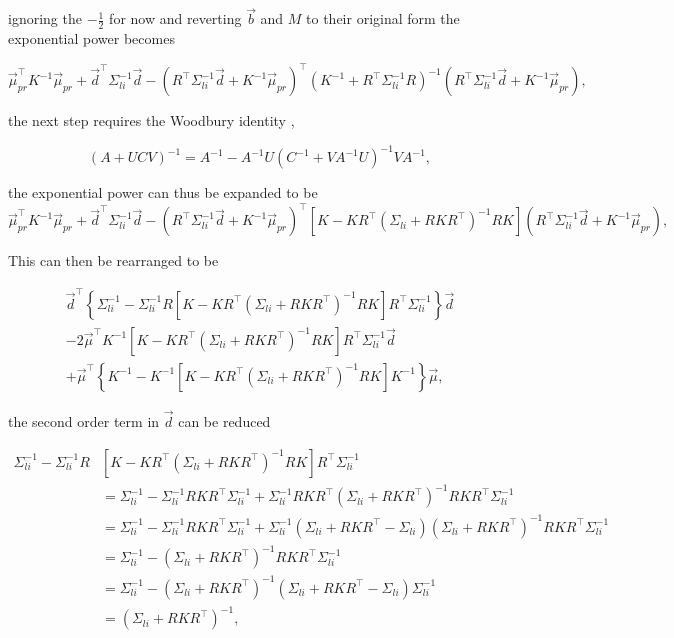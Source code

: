 \noindent ignoring the $-\frac{1}{2}$ for now and reverting $\vec b$ and $M$ to their original form the exponential power becomes

$$
\vec{\mu}_{pr}^{\top} K^{-1} \vec{\mu}_{pr} + \vec{d}^{\top} \Sigma_{li}^{-1} \vec{d}- (R^{\top} \Sigma_{li}^{-1} \vec{d} + K^{-1}\vec{\mu}_{pr})^{\top} (K^{-1} + R^{\top} \Sigma_{li}^{-1} R)^{-1} (R^{\top} \Sigma_{li}^{-1} \vec{d} + K^{-1}\vec{\mu}_{pr}),
$$

\noindent the next step requires the Woodbury identity \cite{gp4ml}, 

\begin{equation}
(A + UCV)^{-1} = A^{-1} - A^{-1}U(C^{-1}+VA^{-1}U)^{-1}VA^{-1},
\end{equation}

\noindent the exponential power can thus be expanded to be
$$
\vec{\mu}_{pr}^{\top} K^{-1} \vec{\mu}_{pr} + \vec{d}^{\top} \Sigma_{li}^{-1} \vec{d} - (R^{\top} \Sigma_{li}^{-1} \vec{d} + K^{-1}\vec{\mu}_{pr})^{\top} \left[K - K R^{\top} \left(\Sigma_{li} + RK R^{\top}\right)^{-1} R K \right] (R^{\top} \Sigma_{li}^{-1} \vec{d} + K^{-1}\vec{\mu}_{pr}),
$$

\noindent This can then be rearranged to be

\begin{multline*}
\vec{d}^{\top} \left\{ \Sigma_{li}^{-1} - \Sigma_{li}^{-1} R \left[K - K R^{\top} \left(\Sigma_{li} + RK R^{\top}\right)^{-1} R K \right] R^{\top} \Sigma_{li}^{-1} \right\} \vec{d} \\- 2 \vec{\mu}^{\top} K^{-1} \left[K - K R^{\top} \left(\Sigma_{li} + RK R^{\top}\right)^{-1} R K \right] R^{\top} \Sigma_{li}^{-1} \vec{d} \\+ \vec{\mu}^{\top} \left\{ K^{-1} - K^{-1}\left[K - K R^{\top} \left(\Sigma_{li} + RK R^{\top}\right)^{-1} R K \right] K^{-1} \right\}\vec{\mu},
\end{multline*}

\noindent the second order term in $\vec d$ can be reduced

$$
\begin{aligned}
\Sigma_{li}^{-1} - \Sigma_{li}^{-1} R &\left[K - K R^{\top} \left(\Sigma_{li} + RK R^{\top}\right)^{-1} R K \right] R^{\top} \Sigma_{li}^{-1} \\ &= \Sigma_{li}^{-1} - \Sigma_{li}^{-1} R K R^{\top} \Sigma_{li}^{-1} + \Sigma_{li}^{-1} R K R^{\top} \left(\Sigma_{li} + RK R^{\top}\right)^{-1} R K R^{\top} \Sigma_{li}^{-1}\\ &= \Sigma_{li}^{-1} - \Sigma_{li}^{-1} R K R^{\top} \Sigma_{li}^{-1} + \Sigma_{li}^{-1} \left(\Sigma_{li} + R K R^{\top} - \Sigma_{li}\right)\left(\Sigma_{li} + RK R^{\top}\right)^{-1} R K R^{\top} \Sigma_{li}^{-1} \\
&= \Sigma_{li}^{-1} - \left(\Sigma_{li} + RK R^{\top}\right)^{-1} R K R^{\top} \Sigma_{li}^{-1} \\ &= \Sigma_{li}^{-1} - \left(\Sigma_{li} + RK R^{\top}\right)^{-1} \left(\Sigma_{li} + R K R^{\top} - \Sigma_{li} \right)\Sigma_{li}^{-1} \\ &= \left(\Sigma_{li} + RK R^{\top}\right)^{-1},
\end{aligned}
$$

